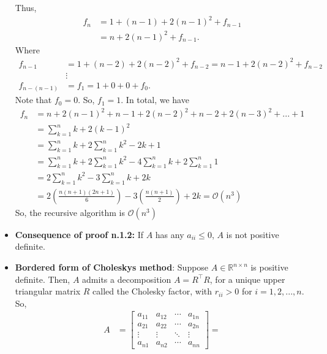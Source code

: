 \documentclass{report}
\begin{document}
\begin{itemize}
\begin{enumerate}
            \end{enumerate}
            \bigbreak \noindent 
            Thus, 
            \begin{align*}
                f_{n} &= 1 + (n-1) + 2(n-1)^{2} + f_{n-1} \\
                &=n + 2(n-1)^{2} + f_{n-1}
            .\end{align*}
            Where
            \begin{align*}
                f_{n-1} &= 1 + (n-2) + 2(n-2)^{2} + f_{n-2} = n-1 + 2(n-2)^{2} + f_{n-2} \\
                        &\vdots \\
                f_{n-(n-1)}  &= f_{1} = 1 + 0 + 0 + f_{0} 
            .\end{align*}
            Note that $f_{0} = 0$. So, $f_{1} = 1$. In total, we have
            \begin{align*}
                f_{n} &= n + 2(n-1)^{2} + n-1 + 2(n-2)^{2} + n-2 + 2(n-3)^{2} + ... + 1 \\
                      &= \sum_{k=1}^{n} k + 2(k-1)^{2} \\
                      &= \sum_{k=1}^{n}k + 2\sum_{k=1}^{n} k^{2} -2k + 1 \\
                      &= \sum_{k=1}^{n}k + 2\sum_{k=1}^{n}k^{2} - 4\sum_{k=1}^{n}k + 2\sum_{k=1}^{n}1 \\
                      &= 2 \sum_{k=1}^{n}k^{2} - 3\sum_{k=1}^{n}k + 2k \\
                      &= 2 \left(\frac{n(n+1)(2n+1)}{6}\right) - 3 \left(\frac{n(n+1)}{2}\right) + 2k = \mathcal{O}(n^{3})
            \end{align*}
            \bigbreak \noindent 
            So, the recursive algorithm is $\mathcal{O}(n^{3})$
        \item \textbf{Consequence of proof n.1.2:} If $A$ has any $a_{ii} \leq 0$, $A$ is not positive definite.
        \item \textbf{Bordered form of Choleskys method}: Suppose $A \in \mathbb{R}^{n\times n}$ is positive definite. Then, $A$ admits a decomposition $A = R^{\top}R$, for a unique upper triangular matrix $R$ called the Cholesky factor, with $r_{ii} > 0$ for $i =1,2,...,n$. So,
            \begin{align*}
                        A &= \begin{bmatrix} a_{11} & a_{12} & \cdots & a_{1n} \\ a_{21} & a_{22} & \cdots & a_{2n} \\ \vdots & \vdots & \ddots & \vdots \\ a_{n1} & a_{n2} & \cdots & a_{nn} \end{bmatrix} = 

\end{align*}
\end{itemize}
\end{document}
